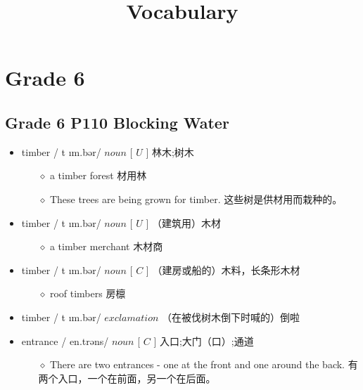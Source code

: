 \documentclass[a4paper,top=2.5cm,buttom=2.5cm10.5pt]{book}
\begin{document}
\title{Vocabulary}
\maketitle

\tableofcontents
\newpage
{}
\chapter{Grade 6}
\textcolor[RGB]{128,0,255}{\section{Grade 6 P110 Blocking Water}}
\begin{itemize}
\item timber / \textprimstress t \i m.bər/ $ noun $ [  $ U $  ] 林木;树木
\begin{itemize}
\item[$\diamond$] a timber forest
材用林
\item[$\diamond$] These trees are being grown for timber.
这些树是供材用而栽种的。
\end{itemize}
\end{itemize}
\begin{itemize}
\item timber / \textprimstress t \i m.bər/ $ noun $ [  $ U $  ] （建筑用）木材
\begin{itemize}
\item[$\diamond$] a timber merchant
木材商
\end{itemize}
\end{itemize}
\begin{itemize}
\item timber / \textprimstress t \i m.bər/ $ noun $ [  $ C $  ] （建房或船的）木料，长条形木材
\begin{itemize}
\item[$\diamond$] roof timbers
房檩
\end{itemize}
\end{itemize}
\begin{itemize}
\item timber / \textprimstress t \i m.bər/ $ exclamation $  （在被伐树木倒下时喊的）倒啦
\end{itemize}
\begin{itemize}
\item entrance / \textprimstress en.trəns/ $ noun $ [  $ C $  ] 入口;大门（口）;通道
\begin{itemize}
\item[$\diamond$] There are two entrances - one at the front and one around the back.
有两个入口，一个在前面，另一个在后面。
\end{itemize}
\end{itemize}
\end{document}
